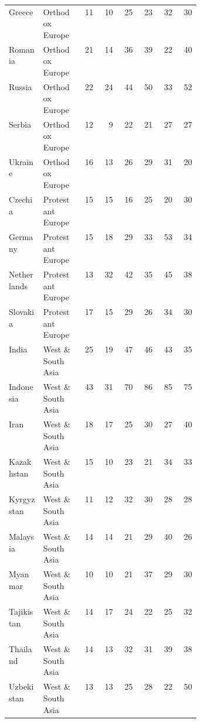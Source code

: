 \begin{longtable}{p{0.18\linewidth}p{0.20\linewidth}rrrrrr}
Greece & Orthodox Europe & 11 & 10 & 25 & 23 & 32 & 30 \\
Romania & Orthodox Europe & 21 & 14 & 36 & 39 & 22 & 40 \\
Russia & Orthodox Europe & 22 & 24 & 44 & 50 & 33 & 52 \\
Serbia & Orthodox Europe & 12 & 9 & 22 & 21 & 27 & 27 \\
Ukraine & Orthodox Europe & 16 & 13 & 26 & 29 & 31 & 20 \\
\addlinespace[2pt]
Czechia & Protestant Europe & 15 & 15 & 16 & 25 & 20 & 30 \\
Germany & Protestant Europe & 15 & 18 & 29 & 33 & 53 & 34 \\
Netherlands & Protestant Europe & 13 & 32 & 42 & 35 & 45 & 38 \\
Slovakia & Protestant Europe & 17 & 15 & 29 & 26 & 34 & 30 \\
\addlinespace[2pt]
India & West \& South Asia & 25 & 19 & 47 & 46 & 43 & 35 \\
Indonesia & West \& South Asia & 43 & 31 & 70 & 86 & 85 & 75 \\
Iran & West \& South Asia & 18 & 17 & 25 & 30 & 27 & 40 \\
Kazakhstan & West \& South Asia & 15 & 10 & 23 & 21 & 34 & 33 \\
Kyrgyzstan & West \& South Asia & 11 & 12 & 32 & 30 & 28 & 28 \\
Malaysia & West \& South Asia & 14 & 14 & 21 & 29 & 40 & 26 \\
Myanmar & West \& South Asia & 10 & 10 & 21 & 37 & 29 & 30 \\
Tajikistan & West \& South Asia & 14 & 17 & 24 & 22 & 25 & 32 \\
Thailand & West \& South Asia & 14 & 13 & 32 & 31 & 39 & 38 \\
Uzbekistan & West \& South Asia & 13 & 13 & 25 & 28 & 22 & 50 \\
\bottomrule
\end{longtable}

